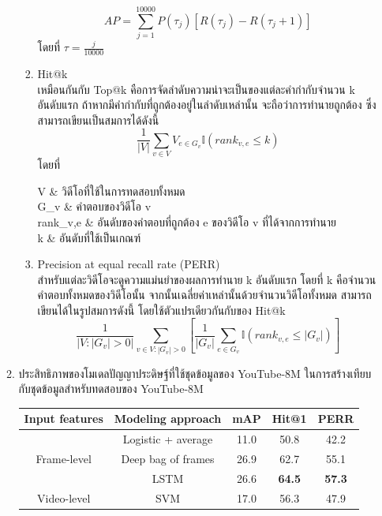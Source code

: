 \begin{enumerate}
\begin{enumerate}
\begin{enumerate}
\begin{equation}
					AP = \sum_{j=1}^{10000}P(\tau_j)[R(\tau_j)-R(\tau_j+1)]
				\end{equation}
				โดยที่ $\tau = \frac{j}{10000}$
				\clearpage
				\item Hit@k\\
				เหมือนกันกับ Top@k คือการจัดลำดับความน่าจะเป็นของแต่ละคำกำกับจำนวน k อันดับแรก ถ้าหากมีคำกำกับที่ถูกต้องอยู่ในลำดับเหล่านั้น จะถือว่าการทำนายถูกต้อง 
				ซึ่งสามารถเขียนเป็นสมการได้ดังนี้
				\begin{equation}
					\frac{1}{|V|}\sum_{v\in V}V_{e\in G_v}\mathbb{I}(rank_{v,e} \leq k)
				\end{equation}
				โดยที่
				\begin{conditions}
					V & วิดีโอที่ใช้ในการทดสอบทั้งหมด\\
					G_v & คำตอบของวิดีโอ v\\
					rank_{v,e} & อันดับของคำตอบที่ถูกต้อง e ของวิดีโอ v ที่ได้จากการทำนาย\\
					k & อันดับที่ใช้เป็นเกณฑ์
				\end{conditions}
				\item Precision at equal recall rate (PERR)\\
				สำหรับแต่ละวิดีโอจะดูความแม่นยำของผลการทำนาย k อันดับแรก โดยที่ k คือจำนวนคำตอบทั้งหมดของวิดีโอนั้น จากนั้นเฉลี่ยค่าเหล่านั้นด้วยจำนวนวิดีโอทั้งหมด
				สามารถเขียนได้ในรูปสมการดังนี้ โดยใช้ตัวแปรเดียวกันกับของ Hit@k
				\begin{equation}
					\frac{1}{|V :|G_v|>0|}\sum_{v\in V:|G_v|>0}\left [\frac{1}{|G_v|}\sum_{e\in G_v}\mathbb{I}(rank_{v,e} \leq |G_v|) \right ]
				\end{equation}
			\end{enumerate}
		\item ประสิทธิภาพของโมเดลปัญญาประดิษฐ์ที่ใช้ชุดข้อมูลของ YouTube-8M ในการสร้างเทียบกับชุดข้อมูลสำหรับทดสอบของ YouTube-8M
			\begin{table}[!ht]
				\centering
				\begin{tabular}{|c|c|c|c|c|}
					\hline
					{Input features} & {Modeling approach} & {mAP} & Hit@1 & PERR\\
					\hline
					\multirow{3}{*}{Frame-level} & Logistic + average & 11.0 & 50.8 & 42.2\\
					& Deep bag of frames & 26.9 & 62.7 & 55.1\\
					& LSTM & 26.6 & \textbf{64.5} & \textbf{57.3}\\
					\hline
					\multirow{3}{*}{Video-level} & SVM & 17.0 & 56.3 & 47.9\\

\end{tabular}
\end{table}
\end{enumerate}
\end{enumerate}
